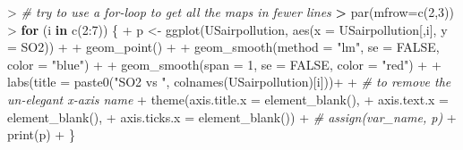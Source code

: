 \documentclass[
]{article}
\newenvironment{Shaded}{\begin{snugshade}}{\end{snugshade}}
\newcommand{\AttributeTok}[1]{\textcolor[rgb]{0.77,0.63,0.00}{#1}}
\newcommand{\CommentTok}[1]{\textcolor[rgb]{0.56,0.35,0.01}{\textit{#1}}}
\newcommand{\ConstantTok}[1]{\textcolor[rgb]{0.00,0.00,0.00}{#1}}
\newcommand{\ControlFlowTok}[1]{\textcolor[rgb]{0.13,0.29,0.53}{\textbf{#1}}}
\newcommand{\DecValTok}[1]{\textcolor[rgb]{0.00,0.00,0.81}{#1}}
\newcommand{\ErrorTok}[1]{\textcolor[rgb]{0.64,0.00,0.00}{\textbf{#1}}}
\newcommand{\FunctionTok}[1]{\textcolor[rgb]{0.00,0.00,0.00}{#1}}
\newcommand{\NormalTok}[1]{#1}
\newcommand{\OtherTok}[1]{\textcolor[rgb]{0.56,0.35,0.01}{#1}}
\newcommand{\SpecialCharTok}[1]{\textcolor[rgb]{0.00,0.00,0.00}{#1}}
\newcommand{\StringTok}[1]{\textcolor[rgb]{0.31,0.60,0.02}{#1}}
\begin{document}
\begin{Shaded}
\begin{Highlighting}[]
\SpecialCharTok{\textgreater{}} \CommentTok{\# try to use a for{-}loop to get all the maps in fewer lines}
\ErrorTok{\textgreater{}} \FunctionTok{par}\NormalTok{(}\AttributeTok{mfrow=}\FunctionTok{c}\NormalTok{(}\DecValTok{2}\NormalTok{,}\DecValTok{3}\NormalTok{))}
\SpecialCharTok{\textgreater{}} \ControlFlowTok{for}\NormalTok{ (i }\ControlFlowTok{in} \FunctionTok{c}\NormalTok{(}\DecValTok{2}\SpecialCharTok{:}\DecValTok{7}\NormalTok{)) \{}
\SpecialCharTok{+}\NormalTok{   p }\OtherTok{\textless{}{-}} \FunctionTok{ggplot}\NormalTok{(USairpollution, }\FunctionTok{aes}\NormalTok{(}\AttributeTok{x =}\NormalTok{ USairpollution[,i], }\AttributeTok{y =}\NormalTok{ SO2)) }\SpecialCharTok{+} 
\SpecialCharTok{+}                 \FunctionTok{geom\_point}\NormalTok{() }\SpecialCharTok{+}
\SpecialCharTok{+}                 \FunctionTok{geom\_smooth}\NormalTok{(}\AttributeTok{method =} \StringTok{"lm"}\NormalTok{, }\AttributeTok{se =} \ConstantTok{FALSE}\NormalTok{, }\AttributeTok{color =} \StringTok{"blue"}\NormalTok{) }\SpecialCharTok{+}
\SpecialCharTok{+}                 \FunctionTok{geom\_smooth}\NormalTok{(}\AttributeTok{span =} \DecValTok{1}\NormalTok{, }\AttributeTok{se =} \ConstantTok{FALSE}\NormalTok{, }\AttributeTok{color =} \StringTok{"red"}\NormalTok{) }\SpecialCharTok{+}
\SpecialCharTok{+}                 \FunctionTok{labs}\NormalTok{(}\AttributeTok{title =} \FunctionTok{paste0}\NormalTok{(}\StringTok{"SO2 vs "}\NormalTok{, }\FunctionTok{colnames}\NormalTok{(USairpollution)[i]))}\SpecialCharTok{+}
\SpecialCharTok{+}                 \CommentTok{\# to remove the un{-}elegant x{-}axis name}
\SpecialCharTok{+}                 \FunctionTok{theme}\NormalTok{(}\AttributeTok{axis.title.x =} \FunctionTok{element\_blank}\NormalTok{(),}
\SpecialCharTok{+}                       \AttributeTok{axis.text.x =} \FunctionTok{element\_blank}\NormalTok{(),}
\SpecialCharTok{+}                       \AttributeTok{axis.ticks.x =} \FunctionTok{element\_blank}\NormalTok{())}
\SpecialCharTok{+}   \CommentTok{\# assign(var\_name, p)}
\SpecialCharTok{+}   \FunctionTok{print}\NormalTok{(p)}
\SpecialCharTok{+}\NormalTok{ \}}
\end{Highlighting}
\end{Shaded}
\end{document}
